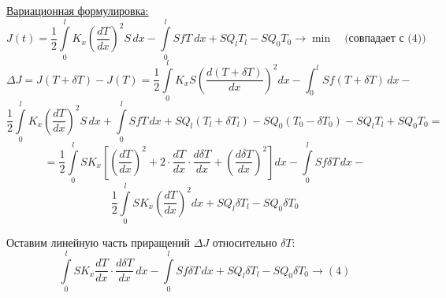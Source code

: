 \documentclass{bmstu}
\begin{document}
	\underline{Вариационная формулировка:}
	\[
		J(t) = \frac{1}{2} \int\limits_0^{l} K_x \left( \frac{dT}{dx} \right)^2 S \, dx - \int\limits_0^{l} SfT \ dx + S Q_l T_l - S Q_0 T_0 \rightarrow \min \quad \text{(совпадает с (4))} 
	\]
	\[
		\Delta J = J(T + \delta T) - J(T) = \frac{1}{2} \int\limits_0^{l} K_x S \left( \frac{d(T + \delta T)}{dx} \right)^2 dx - \int_0^{l} S f (T + \delta T) \, dx -
	\]
	\[  
		 \frac{1}{2} \int\limits_0^{l} K_x \left( \frac{dT}{dx} \right)^2 S \, dx +
		 \int\limits_0^{l} S f T \, dx + S Q_l (T_l + \delta T_l) - S Q_0 (T_0 -\delta T_0) -
		 S Q_l T_l + S Q_0 T_0 =
	\] 
	\[
		= \frac{1}{2} \int\limits_0^{l} S K_x \left[ \left( \frac{dT}{dx} \right)^2 + 2 \cdot \frac{dT}{dx} \cdot \frac{d \delta T}{dx} + \left( \frac{d \delta T}{dx} \right)^2 \right] dx - \int\limits_0^{l} S f \delta T \, dx -
	\]
	\[ \frac{1}{2} \int\limits_0^{l} S K_x \left( \frac{dT}{dx} \right)^2 dx + S Q_l \delta T_l - S Q_0 \delta T_0 
	\]
	
	Оставим линейную часть приращений $\Delta J$ относительно $\delta T$:
	\[
		\int\limits_0^{l} S K_x \frac{dT}{dx}\cdot \frac{d \delta T}{dx} \, dx - \int\limits_0^{l} S f \delta T \, dx + S Q_l \delta T_l - S Q_0 \delta T_0 \rightarrow (4)
	\]
	
\end{document}
